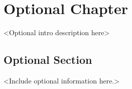 %


\chapter{Optional Chapter}

<Optional intro description here>


\section{Optional Section}

<Include optional information here.>


